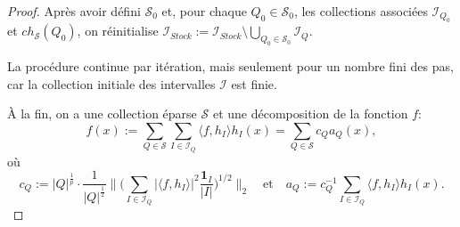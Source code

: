 \documentclass[11pt]{amsart}
\newcommand{\one}{\mathbf{1}}
\newcommand{\ii}{\mathscr}
\newcommand{\ic}{\mathcal}
\newcommand{\ds}{\displaystyle}
\begin{document}
\begin{proof}
Apr\`es avoir d\'efini $\ic S_0$ et, pour chaque $Q_0 \in \ic S_0$, les collections associ\'ees $\ii I_{Q_0}$ et $ch_{\ic S}(Q_0)$, on r\'einitialise $\ii I_{Stock}:= \ii I_{Stock}\setminus \bigcup_{Q_0 \in \ic S_0} \ii I_Q$. 

La proc\'edure continue par it\'eration, mais seulement pour un nombre fini des pas, car la collection initiale des intervalles $\ii I$ est finie.


\`A la fin, on a une collection \'eparse $\ic S$ et une d\'ecomposition de la fonction $f$:
\[
f(x):=\sum_{Q \in \ic S} \sum_{I \in \ii I_Q} \langle f, h_I \rangle h_I(x)= \sum_{Q \in \ic S} c_Q a_Q(x),
\]
o\`u 
$$\ds c_Q:=\vert Q \vert^{\frac{1}{p}} \cdot \frac{1}{\vert Q \vert^{\frac{1}{2}}} \big\| \big(  \sum_{ I \in \ii I_Q}  \vert \langle f, h_I  \rangle \vert^2 \frac{\one_I}{\vert I \vert} \big)^{1/2}  \big\|_2 \quad \textrm{et} \quad a_Q:=c_Q^{-1} \sum_{I \in \ii I_Q} \langle f, h_I \rangle h_I(x).$$


\end{proof}
\end{document}
